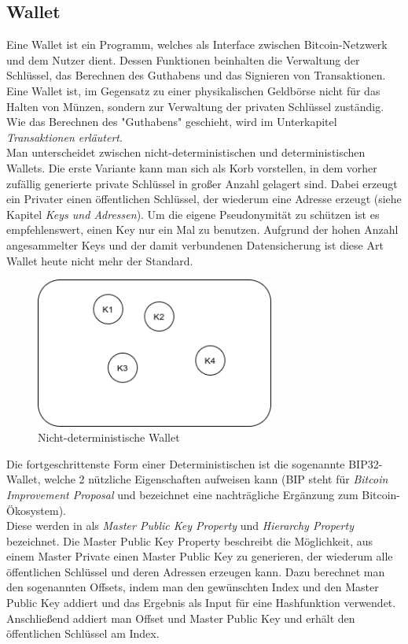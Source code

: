 \subsection{Wallet}
Eine Wallet ist ein Programm, welches als Interface zwischen Bitcoin-Netzwerk und dem Nutzer dient. 
Dessen Funktionen beinhalten die Verwaltung der Schlüssel, das Berechnen des Guthabens und das Signieren von Transaktionen.
Eine Wallet ist, im Gegensatz zu einer physikalischen Geldbörse nicht für das Halten von Münzen, sondern zur Verwaltung der privaten Schlüssel zuständig. 
Wie das Berechnen des "Guthabens" geschieht, wird im Unterkapitel \emph{Transaktionen erläutert}.\\
Man unterscheidet zwischen nicht-deterministischen und deterministischen Wallets. Die erste Variante kann man sich als Korb vorstellen, in dem vorher zufällig generierte private Schlüssel in großer Anzahl gelagert sind. Dabei erzeugt ein Privater einen öffentlichen Schlüssel, der wiederum eine Adresse erzeugt (siehe Kapitel \emph{Keys und Adressen}).
Um die eigene Pseudonymität zu schützen ist es empfehlenswert, einen Key nur ein Mal zu benutzen. Aufgrund der hohen Anzahl angesammelter Keys und der damit verbundenen Datensicherung ist diese Art Wallet heute nicht mehr der Standard.\\
\begin{figure}[htpb]
	\centering
	\includegraphics[width=0.7\textwidth]{images/non_det_wallet.png}
	\caption{Nicht-deterministische Wallet}
	\label{6braun:fig:non-deterministic_wallet}
\end{figure}
Die fortgeschrittenste Form einer Deterministischen ist die sogenannte BIP32-Wallet, welche 2 nützliche Eigenschaften aufweisen kann (BIP steht für \emph{Bitcoin Improvement Proposal} und bezeichnet eine nachträgliche Ergänzung zum Bitcoin-Ökosystem).\\
Diese werden in \cite{buterin_2013} als \emph{Master Public Key Property} und \emph{Hierarchy Property} bezeichnet.
Die Master Public Key Property beschreibt die Möglichkeit, aus einem Master Private einen Master Public Key zu generieren, der wiederum alle öffentlichen Schlüssel und deren Adressen erzeugen kann. Dazu berechnet man den sogenannten Offsets, indem man den gewünschten Index und den Master Public Key addiert und das Ergebnis als Input für eine Hashfunktion verwendet. Anschließend addiert man Offset und Master Public Key und erhält den öffentlichen Schlüssel am Index.

